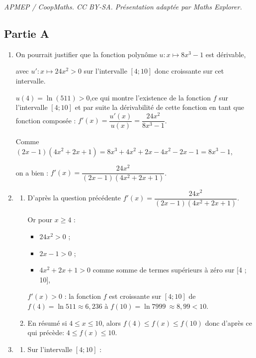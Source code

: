 \documentclass[10pt]{article}
\providecommand{\np}[2][]{{#2~#1}}
\begin{document}
\noindent\textit{APMEP / CoopMaths. CC BY-SA. Présentation adaptée par Maths Explorer.}\par\medskip
\subsection*{Partie A}
\begin{enumerate}
	\item On pourrait justifier que la fonction polynôme \quad $u : x \longmapsto 8x^3 -1$ \quad est dérivable,

	avec \quad $u' : x \longmapsto 24 x ^2 > 0$ \quad sur l'intervalle $[4 ; 10]$ donc croissante sur cet intervalle.

	$u(4) = \ln(511) > 0$,\quad ce qui montre l'existence de la fonction $f$ sur l'intervalle $[4 ; 10]$ et par suite la dérivabilité de cette fonction en tant que fonction composée :
	\quad
	$f'(x) = \dfrac{u'(x)}{u(x)} = \dfrac{24x^2}{8x^3 - 1}$.

	Comme \quad $(2x-1)(4x^2+2x+1) = 8x^3 + 4x^2 + 2x - 4x^2 - 2x - 1 = 8x^3 - 1$,

	on a bien : \quad
	$f'(x) = \dfrac{24x^2}{(2x-1)(4x^2+2x+1)}$.

	\item \begin{enumerate}
		\item D'après la question précédente \quad $f'(x) =  \dfrac{24x^2}{(2x-1)(4x^2+2x+1)}$.

		Or pour $x \geqslant 4$ :

		\begin{itemize}
			\item $24x^2 > 0$ ;

			\item $2x - 1 > 0$ ;

			\item $4x^2+2x+1 > 0$ comme somme de termes supérieurs à zéro sur [4 ; 10],\,
		\end{itemize}

		$f'(x) > 0$ : la fonction $f$ est croissante sur $[4 ; 10]$ de $f(4) = \ln 511 \approx 6,236$ à $f(10) = \ln \np{7999} \approx 8,99 < 10$.

		\item En résumé si $4 \leqslant x \leqslant 10$, alors $f(4) \leqslant f(x) \leqslant f(10)$ donc d'après ce qui précède: $4 \leqslant f(x) \leqslant 10$.
	\end{enumerate}

	\item \begin{enumerate}
		\item Sur l'intervalle $[4 ; 10]$ :


\end{enumerate}
\end{enumerate}
\end{document}
